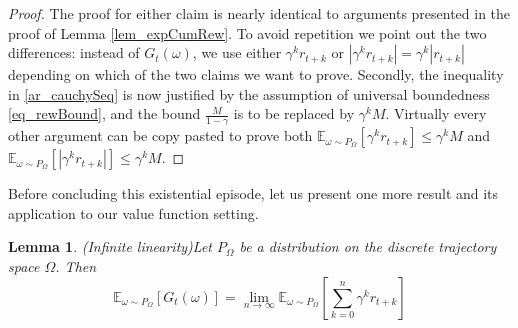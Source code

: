 \documentclass[11pt]{article} %
\newtheorem{lem}{Lemma}
\begin{document}
\begin{proof}
	The proof for either claim is nearly identical to arguments presented in the proof of Lemma \ref{lem_expCumRew}. To avoid repetition we point out the two differences: instead of $G_t(\omega)$, we use either $\gamma^k r_{t+k}$ or $|\gamma^k r_{t+k}| = \gamma^k |r_{t+k}|$ depending on which of the two claims we want to prove. Secondly, the inequality in \ref{ar_cauchySeq} is now justified by the assumption of universal boundedness \ref{eq_rewBound}, and the bound $\frac{M}{1 - \gamma}$ is to be replaced by $\gamma^k M$. Virtually every other argument can be copy pasted to prove both $\mathbb{E}_{\omega \sim P_\Omega}[\gamma^k r_{t+k}] \le \gamma^k M$ and $\mathbb{E}_{\omega \sim P_\Omega}[|\gamma^k r_{t+k}|] \le \gamma^k M$.
\end{proof}

Before concluding this existential episode, let us present one more result and its application to our value function setting.

\begin{lem}{(Infinite linearity)}\label{lem_limExpSwitch}
	Let $P_\Omega$ be a distribution on the discrete trajectory space $\Omega$. Then
	\begin{equation}\label{eq_infLinGt}
		\mathbb{E}_{\omega \sim P_\Omega}\left[ G_t(\omega) \right] = \lim_{n \rightarrow \infty} \mathbb{E}_{\omega \sim P_\Omega}\left[ \sum_{k=0}^n \gamma^k r_{t+k} \right]
	\end{equation}
\end{lem}
\end{document}

